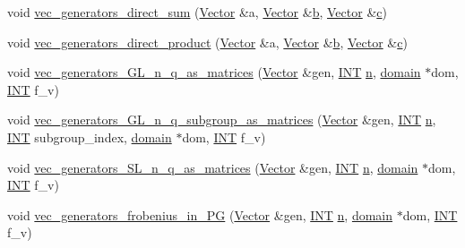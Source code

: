 \begin{DoxyCompactItemize}
\item 
void \mbox{\hyperlink{perm__group__gens_8_c_a178e3d36947987c3450d143f398dd802}{vec\+\_\+generators\+\_\+direct\+\_\+sum}} (\mbox{\hyperlink{class_vector}{Vector}} \&a, \mbox{\hyperlink{class_vector}{Vector}} \&\mbox{\hyperlink{alphabet2_8_c_a148e3876077787926724625411d6e7a9}{b}}, \mbox{\hyperlink{class_vector}{Vector}} \&\mbox{\hyperlink{alphabet2_8_c_a4e1e0e72dd773439e333c84dd762a9c3}{c}})
\item 
void \mbox{\hyperlink{perm__group__gens_8_c_a341c284927a6c274b1d05fe365ea3354}{vec\+\_\+generators\+\_\+direct\+\_\+product}} (\mbox{\hyperlink{class_vector}{Vector}} \&a, \mbox{\hyperlink{class_vector}{Vector}} \&\mbox{\hyperlink{alphabet2_8_c_a148e3876077787926724625411d6e7a9}{b}}, \mbox{\hyperlink{class_vector}{Vector}} \&\mbox{\hyperlink{alphabet2_8_c_a4e1e0e72dd773439e333c84dd762a9c3}{c}})
\item 
void \mbox{\hyperlink{perm__group__gens_8_c_a16af2db378d422175df1fdf70cb02806}{vec\+\_\+generators\+\_\+\+G\+L\+\_\+n\+\_\+q\+\_\+as\+\_\+matrices}} (\mbox{\hyperlink{class_vector}{Vector}} \&gen, \mbox{\hyperlink{galois_8h_a09fddde158a3a20bd2dcadb609de11dc}{I\+NT}} \mbox{\hyperlink{simeon_8_c_a7f2cd26777ce0ff3fdaf8d02aacbddfb}{n}}, \mbox{\hyperlink{classdomain}{domain}} $\ast$dom, \mbox{\hyperlink{galois_8h_a09fddde158a3a20bd2dcadb609de11dc}{I\+NT}} f\+\_\+v)
\item 
void \mbox{\hyperlink{perm__group__gens_8_c_a67390878e31e37836b12fa5d56e72394}{vec\+\_\+generators\+\_\+\+G\+L\+\_\+n\+\_\+q\+\_\+subgroup\+\_\+as\+\_\+matrices}} (\mbox{\hyperlink{class_vector}{Vector}} \&gen, \mbox{\hyperlink{galois_8h_a09fddde158a3a20bd2dcadb609de11dc}{I\+NT}} \mbox{\hyperlink{simeon_8_c_a7f2cd26777ce0ff3fdaf8d02aacbddfb}{n}}, \mbox{\hyperlink{galois_8h_a09fddde158a3a20bd2dcadb609de11dc}{I\+NT}} subgroup\+\_\+index, \mbox{\hyperlink{classdomain}{domain}} $\ast$dom, \mbox{\hyperlink{galois_8h_a09fddde158a3a20bd2dcadb609de11dc}{I\+NT}} f\+\_\+v)
\item 
void \mbox{\hyperlink{perm__group__gens_8_c_aece7a22e0963ee87d325797900443bd2}{vec\+\_\+generators\+\_\+\+S\+L\+\_\+n\+\_\+q\+\_\+as\+\_\+matrices}} (\mbox{\hyperlink{class_vector}{Vector}} \&gen, \mbox{\hyperlink{galois_8h_a09fddde158a3a20bd2dcadb609de11dc}{I\+NT}} \mbox{\hyperlink{simeon_8_c_a7f2cd26777ce0ff3fdaf8d02aacbddfb}{n}}, \mbox{\hyperlink{classdomain}{domain}} $\ast$dom, \mbox{\hyperlink{galois_8h_a09fddde158a3a20bd2dcadb609de11dc}{I\+NT}} f\+\_\+v)
\item 
void \mbox{\hyperlink{perm__group__gens_8_c_a9e10945efd7f35b31fdeb07fa51a86a7}{vec\+\_\+generators\+\_\+frobenius\+\_\+in\+\_\+\+PG}} (\mbox{\hyperlink{class_vector}{Vector}} \&gen, \mbox{\hyperlink{galois_8h_a09fddde158a3a20bd2dcadb609de11dc}{I\+NT}} \mbox{\hyperlink{simeon_8_c_a7f2cd26777ce0ff3fdaf8d02aacbddfb}{n}}, \mbox{\hyperlink{classdomain}{domain}} $\ast$dom, \mbox{\hyperlink{galois_8h_a09fddde158a3a20bd2dcadb609de11dc}{I\+NT}} f\+\_\+v)

\end{DoxyCompactItemize}
